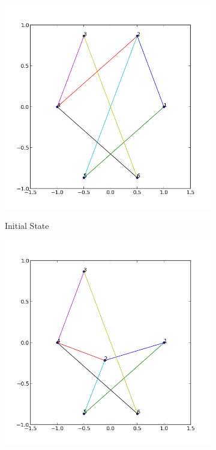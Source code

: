 \documentclass[12pt,a4paper]{article}
\begin{document}
\begin{figure}[htb]
			\begin{subfigure}{.5\textwidth}
			\centering
			\includegraphics[scale=0.4]{results_Kawai/ex1p0}\\
			\caption{Initial State}
			\end{subfigure}\hfill
			\begin{subfigure}{.5\textwidth}
			\centering
			\includegraphics[scale=0.4]{results_Kawai/ex1p1}\\

\end{subfigure}
\end{figure}
\end{document}
